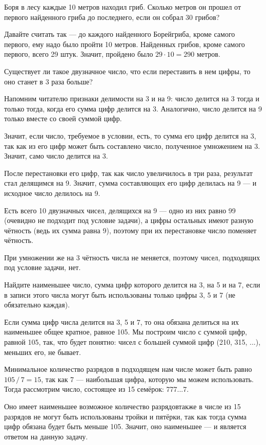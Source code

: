 

\begin{itemize}

	\itA Боря в лесу каждые 10 метров находил гриб. Сколько метров он прошел от первого найденного гриба до последнего, если он собрал 30 грибов?
	
	\itr Давайте считать так — до каждого найденного Борей\linebreak гриба, кроме самого первого, ему надо было пройти 10 метров. Найденных грибов, кроме самого первого, всего 29 штук. Значит, пройдено было $29 \cdot 10 = 290$ метров.
	
	\itB Существует ли такое двузначное число, что если переставить в нем цифры, то оно станет в 3 раза больше?
	
	\itr Напомним читателю признаки делимости на 3 и на 9: число делится на 3 тогда и только тогда, когда его сумма цифр делится на 3. Аналогично, число делится на 9 только вместе со своей суммой цифр.
	
	Значит, если число, требуемое в условии, есть, то сумма его цифр делится на 3, так как из его цифр может быть составлено число, полученное умножением на 3. Значит, само число делится на 3.
	
	После перестановки его цифр, так как число увеличилось в три раза, результат стал делящимся на 9. Значит, сумма составляющих его цифр делилась на  9 — и исходное число делилось на 9.
	
	Есть всего 10 двузначных чисел, делящихся на 9 — одно из них равно 99 (очевидно не подходит под условие задачи), а цифры остальных имеют разную чётность (ведь их сумма равна 9), поэтому при их перестановке число поменяет чётность.
	
	При умножении же на 3 чётность числа не меняется, поэтому чисел, подходящих под условие задачи, нет.
	
	\itC Найдите наименьшее число, сумма цифр которого делится на 3, на 5 и на 7, если в записи этого числа могут быть использованы только цифры 3, 5 и 7 (не обязательно каждая).
	
	\itr Если сумма цифр числа делится на 3, 5 и 7, то она обязана делиться на их наименьшее общее кратное, равное 105. Мы построим число с суммой цифр, равной 105, так, что будет понятно: чисел с большей суммой цифр (210, 315, ...), меньших его, не бывает.
	
	Минимальное количество разрядов в подходящем нам числе может быть равно $105\,/\,7 = 15$, так как 7 — наибольшая цифра, которую мы можем использовать. Тогда рассмотрим число, состоящее из 15 семёрок: 777...7.
	
	Оно имеет наименьшее возможное количество разрядов\scolon также в числе из 15 разрядов не могут быть использованы тройки и пятёрки, так как тогда сумма цифр обязана будет быть меньше 105. Значит, оно наименьшее — и является ответом на данную задачу.

\end{itemize}

